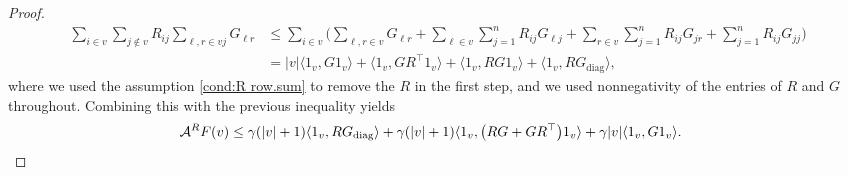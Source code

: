\documentclass[11pt,reqno]{amsart}
\numberwithin{equation}{section}
\theoremstyle{definition}
\def\A{{\mathcal A}}
\begin{document}
\begin{proof}
		\begin{align*}
			\sum_{i\in v}\sum_{j\notin v} R_{ij} \sum_{\ell, r\in vj} G_{\ell r} 
			&\le \sum_{i\in v} \bigg( \sum_{\ell,r\in v} G_{\ell r} + \sum_{\ell\in v} \sum_{j=1}^n R_{ij}G_{\ell j} + \sum_{r\in v} \sum_{j=1}^nR_{ij}G_{j r} + \sum_{j=1}^nR_{ij}G_{j j} \bigg) \\
			&=  |v| \langle 1_v, G 1_v \rangle + \langle 1_v, GR^\top 1_v\rangle  + \langle 1_v, R G 1_v \rangle + \langle 1_v,R G_{\mathrm{diag}}\rangle,
		\end{align*}
		where we used the assumption  \eqref{cond:R row.sum} to remove the $R$ in the first step, and we used nonnegativity of the entries of $R$ and $G$ throughout. 
		Combining this with the previous inequality yields
		\begin{align*}
			\A^{R} F(v) &\le \gamma(|v|+ 1) \langle 1_v,R G_{\mathrm{diag}}\rangle + \gamma (|v|+ 1) \langle 1_v , \big( R G +GR^\top \big) 1_v\rangle + \gamma|v| \langle 1_v, G 1_v \rangle. \qedhere
		\end{align*} 	 
\end{proof}
\end{document}
